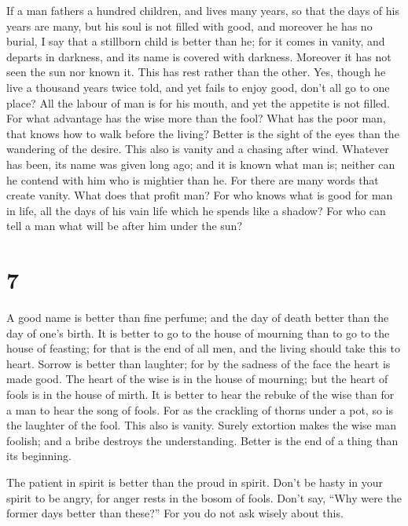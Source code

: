  If a man fathers a hundred children, and lives many
years, so that the days of his years are many, but his soul is not
filled with good, and moreover he has no burial, I say that a stillborn
child is better than he;  for it comes in vanity, and
departs in darkness, and its name is covered with darkness.
 Moreover it has not seen the sun nor known it. This has
rest rather than the other.  Yes, though he live a
thousand years twice told, and yet fails to enjoy good, don't all go to
one place?  All the labour of man is for his mouth, and
yet the appetite is not filled.  For what advantage has
the wise more than the fool? What has the poor man, that knows how to
walk before the living?  Better is the sight of the eyes
than the wandering of the desire. This also is vanity and a chasing
after wind.  Whatever has been, its name was given long
ago; and it is known what man is; neither can he contend with him who is
mightier than he.  For there are many words that create
vanity. What does that profit man?  For who knows what is
good for man in life, all the days of his vain life which he spends like
a shadow? For who can tell a man what will be after him under the sun?

\hypertarget{section-6}{%
\section{7}\label{section-6}}

 A good name is better than fine perfume; and the day of
death better than the day of one's birth.  It is better to
go to the house of mourning than to go to the house of feasting; for
that is the end of all men, and the living should take this to heart.
 Sorrow is better than laughter; for by the sadness of the
face the heart is made good.  The heart of the wise is in
the house of mourning; but the heart of fools is in the house of mirth.
 It is better to hear the rebuke of the wise than for a
man to hear the song of fools.  For as the crackling of
thorns under a pot, so is the laughter of the fool. This also is vanity.
 Surely extortion makes the wise man foolish; and a bribe
destroys the understanding.  Better is the end of a thing
than its beginning.

The patient in spirit is better than the proud in spirit. 
Don't be hasty in your spirit to be angry, for anger rests in the bosom
of fools.  Don't say, ``Why were the former days better
than these?'' For you do not ask wisely about this.

